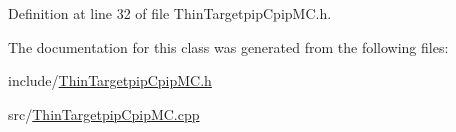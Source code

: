 Definition at line 32 of file Thin\-Targetpip\-Cpip\-M\-C.\-h.



The documentation for this class was generated from the following files\-:\begin{DoxyCompactItemize}
\item 
include/\hyperlink{_thin_targetpip_cpip_m_c_8h}{Thin\-Targetpip\-Cpip\-M\-C.\-h}\item 
src/\hyperlink{_thin_targetpip_cpip_m_c_8cpp}{Thin\-Targetpip\-Cpip\-M\-C.\-cpp}\end{DoxyCompactItemize}

